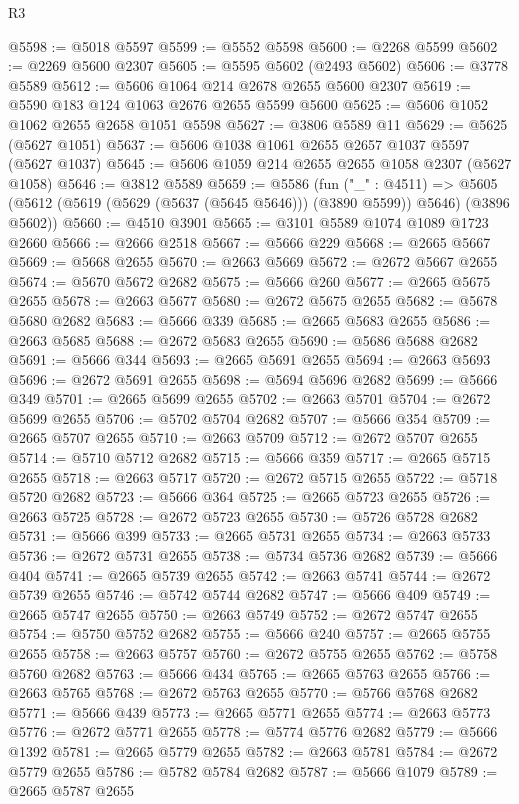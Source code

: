 \begin{lexlean}{R3}
\begin{coremodule}
@5598 := @5018 @5597
@5599 := @5552 @5598
@5600 := @2268 @5599
@5602 := @2269 @5600 @2307
@5605 := @5595 @5602 (@2493 @5602)
@5606 := @3778 @5589
@5612 := @5606 @1064 @214 @2678 @2655 @5600 @2307
@5619 := @5590 @183 @124 @1063 @2676 @2655 @5599 @5600
@5625 := @5606 @1052 @1062 @2655 @2658 @1051 @5598
@5627 := @3806 @5589 @11
@5629 := @5625 (@5627 @1051)
@5637 := @5606 @1038 @1061 @2655 @2657 @1037 @5597 (@5627 @1037)
@5645 := @5606 @1059 @214 @2655 @2655 @1058 @2307 (@5627 @1058)
@5646 := @3812 @5589
@5659 := @5586
    (fun ("_" : @4511) =>
    @5605 (@5612 (@5619 (@5629 (@5637 (@5645 @5646))) (@3890 @5599)) @5646) (@3896 @5602))
@5660 := @4510 @3901
@5665 := @3101 @5589 @1074 @1089 @1723 @2660
@5666 := @2666 @2518
@5667 := @5666 @229
@5668 := @2665 @5667
@5669 := @5668 @2655
@5670 := @2663 @5669
@5672 := @2672 @5667 @2655
@5674 := @5670 @5672 @2682
@5675 := @5666 @260
@5677 := @2665 @5675 @2655
@5678 := @2663 @5677
@5680 := @2672 @5675 @2655
@5682 := @5678 @5680 @2682
@5683 := @5666 @339
@5685 := @2665 @5683 @2655
@5686 := @2663 @5685
@5688 := @2672 @5683 @2655
@5690 := @5686 @5688 @2682
@5691 := @5666 @344
@5693 := @2665 @5691 @2655
@5694 := @2663 @5693
@5696 := @2672 @5691 @2655
@5698 := @5694 @5696 @2682
@5699 := @5666 @349
@5701 := @2665 @5699 @2655
@5702 := @2663 @5701
@5704 := @2672 @5699 @2655
@5706 := @5702 @5704 @2682
@5707 := @5666 @354
@5709 := @2665 @5707 @2655
@5710 := @2663 @5709
@5712 := @2672 @5707 @2655
@5714 := @5710 @5712 @2682
@5715 := @5666 @359
@5717 := @2665 @5715 @2655
@5718 := @2663 @5717
@5720 := @2672 @5715 @2655
@5722 := @5718 @5720 @2682
@5723 := @5666 @364
@5725 := @2665 @5723 @2655
@5726 := @2663 @5725
@5728 := @2672 @5723 @2655
@5730 := @5726 @5728 @2682
@5731 := @5666 @399
@5733 := @2665 @5731 @2655
@5734 := @2663 @5733
@5736 := @2672 @5731 @2655
@5738 := @5734 @5736 @2682
@5739 := @5666 @404
@5741 := @2665 @5739 @2655
@5742 := @2663 @5741
@5744 := @2672 @5739 @2655
@5746 := @5742 @5744 @2682
@5747 := @5666 @409
@5749 := @2665 @5747 @2655
@5750 := @2663 @5749
@5752 := @2672 @5747 @2655
@5754 := @5750 @5752 @2682
@5755 := @5666 @240
@5757 := @2665 @5755 @2655
@5758 := @2663 @5757
@5760 := @2672 @5755 @2655
@5762 := @5758 @5760 @2682
@5763 := @5666 @434
@5765 := @2665 @5763 @2655
@5766 := @2663 @5765
@5768 := @2672 @5763 @2655
@5770 := @5766 @5768 @2682
@5771 := @5666 @439
@5773 := @2665 @5771 @2655
@5774 := @2663 @5773
@5776 := @2672 @5771 @2655
@5778 := @5774 @5776 @2682
@5779 := @5666 @1392
@5781 := @2665 @5779 @2655
@5782 := @2663 @5781
@5784 := @2672 @5779 @2655
@5786 := @5782 @5784 @2682
@5787 := @5666 @1079
@5789 := @2665 @5787 @2655

\end{coremodule}
\end{lexlean}
